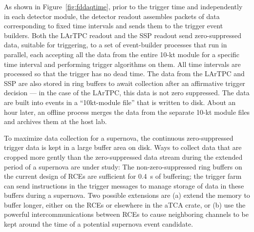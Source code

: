 As shown in Figure~\ref{fig:fddaqtime}, prior to the trigger time and
independently in each detector module, the detector readout assembles
packets of data corresponding to fixed time intervals and sends them
to the trigger event builders.  Both the LArTPC readout and the SSP
readout send zero-suppressed data, suitable for triggering, to a set
of event-builder processes that run in parallel, each accepting all
the data from the entire 10-kt module for a specific time interval and
performing trigger algorithms on them.  All time intervals are
processed so that the trigger has no dead time.  The data from the LArTPC and SSP
are also stored in ring buffers
  to await collection after an
affirmative trigger decision --- in the case of the LArTPC, this data
is not zero suppressed.  The data are built into events in a ``10kt-module
file'' that is written to disk.  About an hour later, an offline process merges
the data from the separate 10-kt module files and archives them at the host lab.

To maximize data collection for a supernova, the continuous
zero-suppressed trigger data is kept in a large buffer area on disk.
Ways to collect data that are cropped more gently than the zero-suppressed 
data stream during the extended period of a supernova are
under study: The non-zero-suppressed ring buffers on the current
design of RCEs are
sufficient for 0.4~s of buffering; the trigger farm can send
instructions in the trigger messages to manage storage of data in
these buffers during a supernova. Two possible extensions
are (a) extend the memory to buffer longer, either on the RCEs or
elsewhere in the aTCA crate, or (b) use the powerful intercommunications between
RCEs to cause neighboring channels to be kept around the time of a
potential supernova event candidate. 


